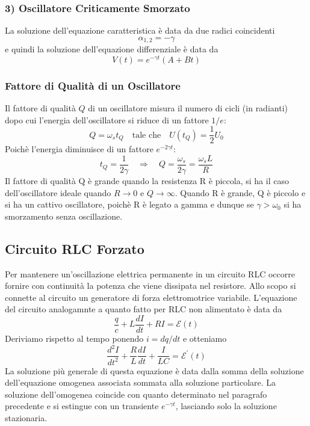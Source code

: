 \subsubsection{3) Oscillatore Criticamente Smorzato}
La soluzione dell'equazione caratteristica \`e data da due radici coincidenti
\begin{equation*}
	\alpha_{1,2} = - \gamma 
\end{equation*}
e quindi la soluzione dell'equazione differenziale \`e data da
\begin{equation*}
	V(t) = e^{-\gamma t} (A+Bt)
\end{equation*}

\subsubsection{Fattore di Qualit\`a di un Oscillatore}

Il fattore di qualit\`a $Q$ di un oscillatore misura il numero di cicli (in radianti) dopo cui l'energia dell'oscillatore si riduce di un fattore $1/e$:
\begin{equation*}
	Q = \omega_s t_Q \quad \text{tale che} \quad U(t_Q) = \frac{1}{2}U_0 
\end{equation*}
Poich\`e l'energia diminuisce di un fattore $e^{-2 \gamma t}$:
\begin{equation*}
	t_Q = \frac{1}{2 \gamma} \quad \Rightarrow \quad Q = \frac{\omega_s}{2 \gamma} = \frac{\omega_s L}{R}
\end{equation*}
Il fattore di qualit\`a Q \`e grande quando la resistenza R \`e piccola, si ha il caso dell'oscillatore ideale quando $R \to 0 $ e $Q \to \infty$. Quando R \`e grande, Q \`e piccolo e si ha un cattivo oscillatore, poich\`e R \`e legato a gamma e dunque se $\gamma > \omega_0$ si ha smorzamento senza oscillazione.

\subsection{Circuito RLC Forzato}


Per mantenere un'oscillazione elettrica permanente in un circuito RLC occorre fornire con continuit\`a la potenza che viene dissipata nel resistore. Allo scopo si connette al circuito un generatore di forza elettromotrice variabile. L'equazione del circuito analogamnte a quanto fatto per RLC non alimentato \`e data da
\begin{equation*}
	\frac{q}{c} + L \frac{dI}{dt} + RI =  \mathcal{E}(t)
\end{equation*}
Deriviamo rispetto al tempo ponendo $i = dq/dt$ e otteniamo 
\begin{equation}
	\frac{d^2I}{dt^2} + \frac{R}{L} \frac{dI}{dt} + \frac{I}{LC} = \mathcal{E}^\prime (t)
\end{equation}
La soluzione pi\`u generale di questa equazione \`e data dalla somma della soluzione dell'equazione omogenea associata sommata alla soluzione particolare. La soluzione dell'omogenea coincide con quanto determinato nel paragrafo precedente e si estingue con un transiente $e^{-\gamma t}$, lasciando solo la soluzione stazionaria.

